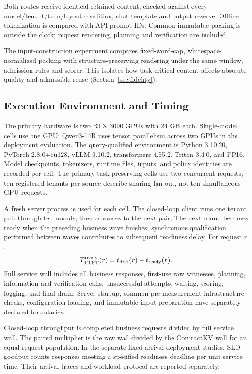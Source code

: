 Both routes receive identical retained content, checked against every model/tenant/turn/layout condition, chat template and output reserve. Offline tokenization is compared with API prompt IDs. Common immutable packing is outside the clock; request rendering, planning and verification are included.

The input-construction experiment compares fixed-word-cap, whitespace-normalized packing with structure-preserving rendering under the same window, admission rules and scorer. This isolates how task-critical content affects absolute quality and admissible reuse (Section~\ref{sec:fidelity}).

\subsection{Execution Environment and Timing}
The primary hardware is two RTX 3090 GPUs with 24 GB each. Single-model cells use one GPU; Qwen3-14B uses tensor parallelism across two GPUs in the deployment evaluation. The query-qualified environment is Python 3.10.20, PyTorch 2.8.0+cu128, vLLM 0.10.2, transformers 4.55.2, Triton 3.4.0, and FP16. Model checkpoints, tokenizers, runtime files, inputs, and policy identities are recorded per cell. The primary task-preserving cells use two concurrent requests; ten registered tenants per source describe sharing fan-out, not ten simultaneous GPU requests.

A fresh server process is used for each cell. The closed-loop client runs one tenant pair through ten rounds, then advances to the next pair. The next round becomes ready when the preceding business wave finishes; synchronous qualification performed between waves contributes to subsequent readiness delay. For request $r$,
\begin{equation}
 T^{\rm ready}_{\rm TTFT}(r)=t_{\rm first}(r)-t_{\rm ready}(r).
\end{equation}
Full service wall includes all business responses, first-use raw witnesses, planning, information and verification calls, unsuccessful attempts, waiting, scoring, logging, and final drain. Server startup, common pre-measurement infrastructure checks, configuration loading, and immutable input preparation have separately declared boundaries.

Closed-loop throughput is completed business requests divided by full service wall. The paired multiplier is the raw wall divided by the ContractKV wall for an equal request population. In the separate fixed-arrival deployment studies, SLO goodput counts responses meeting a specified readiness deadline per unit service time. Their arrival traces and workload protocol are reported separately.

